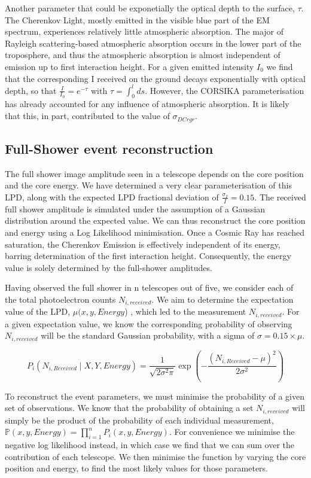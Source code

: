 \documentclass[11pt]{article}
\begin{document}
Another parameter that could be exponetially the optical depth to the surface, $\tau$. The Cherenkov Light, mostly emitted in the visible blue part of the EM spectrum, experiences relatively little atmospheric absorption. The major of Rayleigh scattering-based atmospheric absorption occurs in the lower part of the troposphere, and thus the atmospheric absorption is almost independent of emission up to first interaction height. For a given emitted intensity $I_{0}$ we find that the corresponding I received on the ground decays exponentially with optical depth, so that $\frac{I}{I_{0}}=e^{-\tau}$ with $\tau=\int_{0}^{l}ds$. However, the CORSIKA parameterisation has already accounted for any influence of atmospheric absorption. It is likely that this, in part, contributed to the value of $\sigma_{DCrgr}$.

\subsection{Full-Shower event reconstruction}
The full shower image amplitude seen in a telescope depends on the core position and the core energy. We have determined a very clear parameterisation of this LPD, along with the expected LPD fractional deviation of $\frac{\sigma_{I}}{I}= 0.15$. The received full shower amplitude is simulated under the assumption of a Gaussian distribution around the expected value. We can thus reconstruct the core position and energy using a Log Likelihood minimisation. Once a Cosmic Ray has reached saturation, the Cherenkov Emission is effectively independent of its energy, barring determination of the first interaction height. Consequently, the energy value is solely determined by the full-shower amplitudes. 

Having observed the full shower in n telescopes out of five, we consider each of the total photoelectron counts $N_{i, received}$. We aim to determine the expectation value of the LPD, $\mu(x, y, Energy$) , which led to the measurement $N_{i, received}$. For a given expectation value, we know the corresponding probability of observing $N_{i, received}$ will be the standard Gaussian probability, with a sigma of $\sigma = 0.15 \times \mu$.

\[  P_{i} ( N_{i, Received} \mid X, Y, Energy )  =  \frac{1}{\sqrt{2 \sigma^{2} \pi}} \exp(-\frac{(N_{i, Received} - \mu)^{2}}{2 \sigma^{2}}) \]

To reconstruct the event parameters, we must minimise the probability of a given set of observations. We know that the probability of obtaining a set $N_{i,received}$ will simply be the product of the probability of each individual measurement, $\mathbb{P}(x, y, Energy) = \prod_{i=1}^{n} P_{i}(x, y, Energy)$. For convenience we minimise the negative log likelihood instead, in which case we find that we can sum over the contribution of each telescope. We then minimise the function by varying the core position and energy, to find the most likely values for those parameters.
\end{document}
